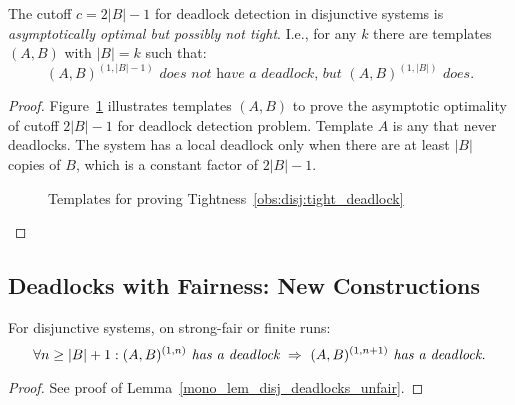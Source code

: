 \begin{tightness} \label{obs:disj:tight_deadlock}
The cutoff $c=2|B|-1$ for deadlock detection in disjunctive systems is \emph{asymptotically optimal but possibly not tight}.
I.e., for any $k$ there are templates $(A,B)$ with $|B|=k$ such that:
$$
(A,B)^{(1,|B|-1)} \textit{ does not have a deadlock, but } (A,B)^{(1,|B|)} \textit { does}.
$$
\end{tightness}
\begin{proof}
Figure~\ref{fig:obs:disj:tight_deadlock} illustrates templates $(A,B)$ to prove the asymptotic optimality of cutoff $2|B|-1$ for deadlock detection problem. Template $A$ is any that never deadlocks. The system has a local deadlock only when there are at least $|B|$ copies of $B$, which is a constant factor of $2|B|-1$.
\begin{figure}[tb] \centering
\makebox[0.4\textwidth][c]{
\scalebox{0.75}{}
}
\caption{Templates for proving Tightness~\ref{obs:disj:tight_deadlock}}
\label{fig:obs:disj:tight_deadlock}
\end{figure}
\end{proof}

%
%


\subsection{Deadlocks with Fairness: New Constructions} \label{gua:sec:proofs-disj-deadlock-fair}

\begin{lemma} \label{mono_lem_disj_deadlocks_fair}
For disjunctive systems, on strong-fair or finite runs:
$$
\forall n\geq |B|+1: (A,B)^{(1,n)} \textit{ has a deadlock} 
\ \Impl\ 
(A,B)^{(1,n+1)} \textit{ has a deadlock.}
$$
\end{lemma}
\begin{proof}
See proof of Lemma~\ref{mono_lem_disj_deadlocks_unfair}.
\end{proof}

